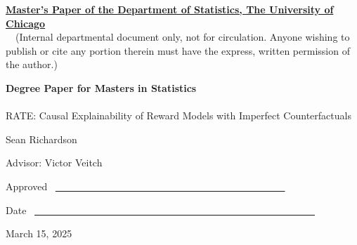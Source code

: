 \documentclass{article}
\theoremstyle{definition}
\begin{document}
    
    \noindent
    \thispagestyle{empty}
    \underline{\bf Master's Paper of the Department of Statistics, The University of Chicago}
    \\~~(Internal departmental document only, not for circulation. Anyone wishing to publish or cite any portion therein must have the express, written permission of the author.)
    
    \vspace{1.8in}
    \begin{center}
    {\bf\LARGE Degree Paper for Masters in Statistics}
    \\~\\
    {\Large RATE: Causal Explainability of Reward Models with Imperfect Counterfactuals}
    
    \vspace{1.4in}
    {\Large Sean Richardson}
    
    \vspace{1.3in}
    {\Large Advisor: Victor Veitch}
    
    \end{center}
    
    \vspace{.6in}
    {\Large Approved} ~\underline{~~~~~~~~~~~~~~~~~~
    ~~~~~~~~~~~~~~~~~~~~~~~~~~~~}
    
    \vspace{.2in}
    {\Large Date} ~\underline{~~~~~~~~~~~~~~~~~~~~~~~~~~~~~~~~~~~~~~~~~~~~~~~~~~~~~~~~~}
    
    \vfill
    \begin{center}{\large March 15, 2025}\end{center}
    
\end{document}
